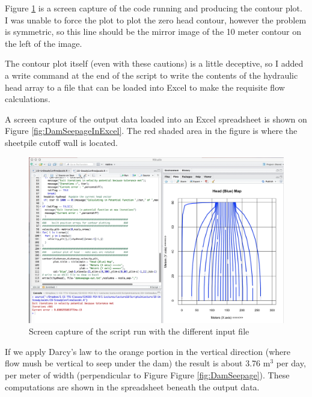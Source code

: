 Figure \ref{fig:DamSeepageInR} is a screen capture of the code running and producing the contour plot. 
I was unable to force the plot to plot the zero head contour, however the problem is symmetric, so this line should be the mirror image of the 10 meter contour on the left of the image.

The contour plot itself (even with these cautions) is a little deceptive, so I added a write command at the end of the script to write the contents of the hydraulic head array to a file that can be loaded into Excel to make the requisite flow calculations.

A screen capture of the output data loaded into an Excel spreadsheet is shown on Figure \ref{fig:DamSeepageInExcel}.  
The red shaded area in the figure is where the sheetpile cutoff wall is located. \newpage
\begin{figure}[h!] %
   \centering
   \includegraphics[width=6in]{./17-SteadyGroundwaterFlow/DamSeepageInR.jpg} 
   \caption{Screen capture of the script run with the different input file}
   \label{fig:DamSeepageInR}
\end{figure}
If we apply Darcy's law to the orange portion in the vertical direction (where flow mush be vertical to seep under the dam) the result is about 3.76 m$^3$ per day, per meter of width (perpendicular to Figure Figure \ref{fig:DamSeepage}).
These computations are shown in the spreadsheet beneath the output data.

